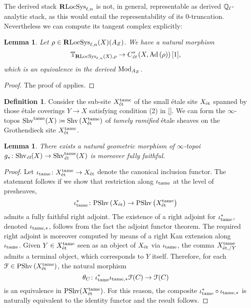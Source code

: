 \documentclass[10pt,a4paper]{amsart}
\numberwithin{equation}{subsection}
\theoremstyle{plain}
\newtheorem{lemma}[theorem]{Lemma}
\theoremstyle{definition}
\newtheorem{defi}[theorem]{Definition}
\theoremstyle{remark}
\numberwithin{equation}{section}
\begin{document}
The derived stack $ \mathbf R \mathrm{LocSys}_{\ell, n}$ is not, in general, representable as derived $\mathbb{Q}_\ell$-analytic stack, as this would entail the representability of its $0$-truncation. Nevertheless we can compute its tangent
complex explicitly:

\begin{lemma}{\cite[Proposition 4.4.9.]{me1}}
Let $\rho \in \mathbf R \mathrm{LocSys}_{\ell, n}(X)(A_Z)$. We have a natural morphism
	\[
		\mathbb{T}_{ \mathbf R \mathrm{LocSys}_{\ell, n}(X), \rho} \to C^*_{\emph{\text{\'et}}}\left(X, \mathrm{Ad} \left( \rho \right) \right)[1] , 
	\]
which is an equivalence in the derived \infcat $\mathrm{Mod}_{A_Z}$.
\end{lemma}

\begin{proof}
The proof of \cite[Proposition 4.4.9]{me1} applies.
\end{proof}

\begin{defi}Consider the sub-site $X^{\mathrm{tame}}_{ \text{\'et}}$ of the small \'etale site $X_{\text{\'et}}$ spanned by those \'etale coverings $Y \to X$ satisfying condition (2) in \cref{}. We can form the $\infty$-topos $\mathrm{Shv}^{\mathrm{tame}}(X) \coloneqq \mathrm{Shv} \left( X^{\mathrm{tame}}_{\text{\'et}} \right)$
of \emph{tamely ramified} \'etale sheaves on the Grothendieck site $X^{\mathrm{tame}}_{\text{\'et}}$.
\end{defi}

\begin{lemma}
There exists a natural geometric morphism of $\infty$-topoi $g_* \colon \mathrm{Shv}_{\emph{\text{\'et}}}(X) \to \mathrm{Shv}^{\mathrm{tame}}_{\emph{\text{\'et}}}(X)$  is moreover fully faithful.
\end{lemma}

\begin{proof} Let $\iota_{\mathrm{tame}} \colon X^{\mathrm{tame}}_{\text{\'et}} \to X_{\text{\'et}}$ denote the canonical inclusion functor. The statement follows if we show that restriction along $\iota_{\mathrm{tame}}$ at the level of presheaves,
	\[
		\iota_{\mathrm{tame}}^* \colon \mathrm{PShv} \left( X_{\text{\'et}} \right) \to \mathrm{PShv} \left( X^{\mathrm{tame}}_{\text{\'et}} \right)
	\]
 admits a fully faithful right adjoint. The existence of a right adjoint for $\iota_{\mathrm{tame}}^*$, denoted $\iota_{\mathrm{tame}, *}$, follows from the fact the adjoint functor theorem. The required right adjoint is moreover computed by means of a right Kan extension along $
 \iota_{\mathrm{tame}}$. Given $Y \in X_{\text{\'et}}^{\mathrm{tame}}$ seen as an object of $X_{\text{\'et}}$ via $\iota_{\mathrm{tame}}$, the comma \infcat $X_{\text{\'et},  / Y}^{\mathrm{tame}}$ admits a terminal object, which corresponds to $Y$ itself. Therefore, for each
 $\mathcal{F} \in \mathrm{PShv} \left( X_{\text{\'et}}^{\mathrm{tame}} \right)$, the natural morphism
 	\[	
		\theta_C \colon \iota^*_{\mathrm{tame}} \iota_{\mathrm{tame}, *} \mathcal{F}(C) \to \mathcal{F}(C)
	\]
 is an equivalence in $\mathrm{PShv}(X_{\text{\'et}}^{\mathrm{tame}})$. For this reason, the composite $\iota^*_{\mathrm{tame}} \circ \iota_{\mathrm{tame}, *} $ is naturally equivalent to the identity functor and the result follows.
\end{proof}
\end{document}
